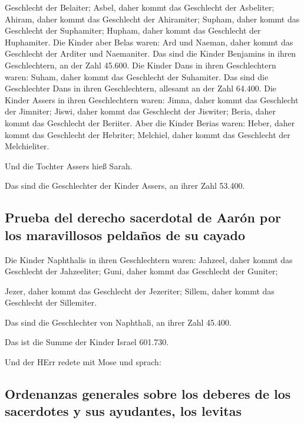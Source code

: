 Geschlecht der Belaiter; Asbel, daher kommt das Geschlecht der
Asbeliter; Ahiram, daher kommt das Geschlecht der Ahiramiter;
 Supham, daher kommt das Geschlecht der Suphamiter;
Hupham, daher kommt das Geschlecht der Huphamiter.  Die
Kinder aber Belas waren: Ard und Naeman, daher kommt das Geschlecht der
Arditer und Naemaniter.  Das sind die Kinder Benjamins in
ihren Geschlechtern, an der Zahl 45.600.  Die Kinder Dans
in ihren Geschlechtern waren: Suham, daher kommt das Geschlecht der
Suhamiter.  Das sind die Geschlechter Dans in ihren
Geschlechtern, allesamt an der Zahl 64.400.  Die Kinder
Assers in ihren Geschlechtern waren: Jimna, daher kommt das Geschlecht
der Jimniter; Jiswi, daher kommt das Geschlecht der Jiswiter; Beria,
daher kommt das Geschlecht der Beriiter.  Aber die Kinder
Berias waren: Heber, daher kommt das Geschlecht der Hebriter; Melchiel,
daher kommt das Geschlecht der Melchieliter.

 Und die Tochter Assers hieß Sarah.

 Das sind die Geschlechter der Kinder Assers, an ihrer
Zahl 53.400.

\hypertarget{prueba-del-derecho-sacerdotal-de-aaruxf3n-por-los-maravillosos-peldauxf1os-de-su-cayado}{%
\subsection{Prueba del derecho sacerdotal de Aarón por los maravillosos
peldaños de su
cayado}\label{prueba-del-derecho-sacerdotal-de-aaruxf3n-por-los-maravillosos-peldauxf1os-de-su-cayado}}

 Die Kinder Naphthalis in ihren Geschlechtern waren:
Jahzeel, daher kommt das Geschlecht der Jahzeeliter; Guni, daher kommt
das Geschlecht der Guniter;

 Jezer, daher kommt das Geschlecht der Jezeriter; Sillem,
daher kommt das Geschlecht der Sillemiter.

 Das sind die Geschlechter von Naphthali, an ihrer Zahl
45.400.

 Das ist die Summe der Kinder Israel 601.730.

 Und der HErr redete mit Mose und sprach:

\hypertarget{ordenanzas-generales-sobre-los-deberes-de-los-sacerdotes-y-sus-ayudantes-los-levitas}{%
\subsection{Ordenanzas generales sobre los deberes de los sacerdotes y
sus ayudantes, los
levitas}\label{ordenanzas-generales-sobre-los-deberes-de-los-sacerdotes-y-sus-ayudantes-los-levitas}}

